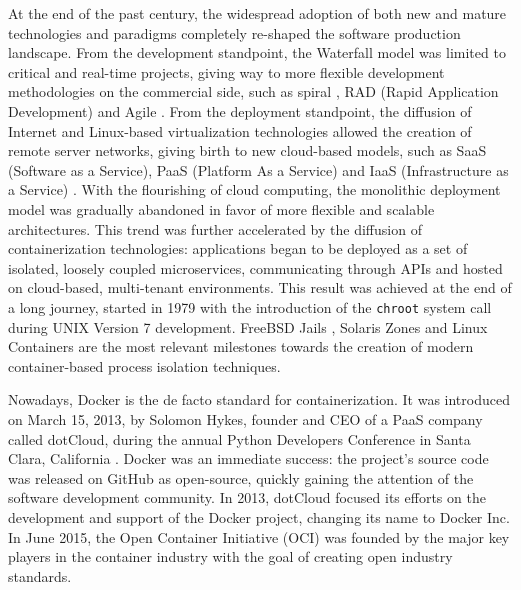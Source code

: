 \newpage
At the end of the past century, the widespread adoption of both new and mature technologies and paradigms completely re-shaped the software production landscape. From the development standpoint, the Waterfall model was limited to critical and real-time projects, giving way to more flexible development methodologies on the commercial side, such as spiral \cite{boehm1988spiral}, RAD (Rapid Application Development) \cite{martinRapidApplicationDevelopment1991} and Agile \cite{ManifestoAgileSoftware}. 
From the deployment standpoint, the diffusion of Internet and Linux-based virtualization technologies allowed the creation of remote server networks, giving birth to new cloud-based models, such as SaaS (Software as a Service), PaaS (Platform As a Service) and IaaS (Infrastructure as a Service) \cite{manvi2014resource}. With the flourishing of cloud computing, the monolithic deployment model was gradually abandoned in favor of more flexible and scalable architectures. This trend was further accelerated by the diffusion of containerization technologies:  applications began to be deployed as a set of isolated, loosely coupled microservices, communicating through APIs and hosted on cloud-based, multi-tenant environments.
This result was achieved at the end of a long journey, started in 1979 with the introduction of the \texttt{chroot} system call \cite{kerriskLinuxProgrammingInterface2010} during UNIX Version 7 development. FreeBSD Jails \cite{kampJailsConfiningOmnipotent}, Solaris Zones \cite{priceSolarisZonesOperating2004} and Linux Containers \cite{LinuxContainers} are the most relevant milestones towards the creation of modern container-based process isolation techniques.

Nowadays, Docker is the de facto standard for containerization. It was introduced on March 15, 2013, by Solomon Hykes, founder and CEO of a PaaS company called dotCloud, during the annual Python Developers Conference in Santa Clara, California \cite{hykesLightningTalkFuture2013}. Docker was an immediate success: the project's source code was released on GitHub as open-source, quickly gaining the attention of the software development community.
In 2013, dotCloud focused its efforts on the development and support of the Docker project, changing its name to Docker Inc. In June 2015, the Open Container Initiative (OCI) \cite{OpenContainerInitiative} was founded by the major key players in the container industry with the goal of creating open industry standards.

